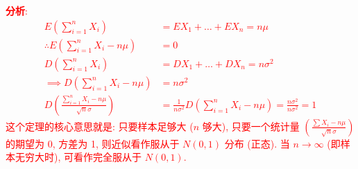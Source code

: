 \documentclass[padp]{ExBook}
\begin{document}
\vspace{1em}
\textcolor{red}{
\textbf{分析}:
\begin{align*}
E\left(\sum_{i=1}^{n}X_i\right) &= EX_1 + \dots + EX_n = n\mu \\
\therefore E\left(\sum_{i=1}^{n}X_i - n\mu\right) &= 0 \\
D\left(\sum_{i=1}^{n}X_i\right) &= DX_1 + \dots + DX_n = n\sigma^2 \\
\implies D\left(\sum_{i=1}^{n}X_i - n\mu\right) &= n\sigma^2 \\
D\left(\frac{\sum_{i=1}^{n}X_i - n\mu}{\sqrt{n}\sigma}\right) &= \frac{1}{n\sigma^2} D\left(\sum_{i=1}^{n}X_i - n\mu\right) = \frac{n\sigma^2}{n\sigma^2} = 1
\end{align*}
这个定理的核心意思就是: 只要样本足够大 ($n$ 够大), 只要一个统计量 $\left(\frac{\sum X_i - n\mu}{\sqrt{n}\sigma}\right)$ 的期望为 0, 方差为 1, 则近似看作服从于 $N(0,1)$ 分布 (正态).
当 $n \to \infty$ (即样本无穷大时), 可看作完全服从于 $N(0,1)$.
}
\clearpage
\end{document}
